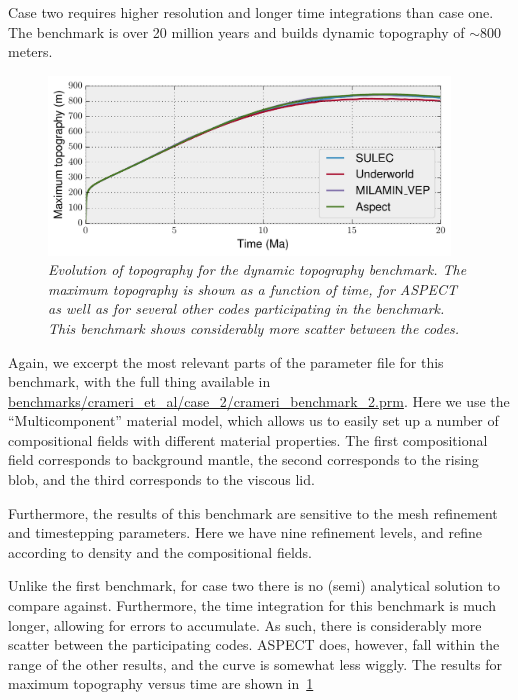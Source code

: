 \documentclass{article}
\newcommand{\aspect}{\textsc{ASPECT}}
\begin{document}
Case two requires higher resolution and longer time integrations than case one. The benchmark
is over 20 million years and builds dynamic topography of $\sim 800$ meters.  

\begin{figure}
  \begin{center}
    \includegraphics[width=0.95\textwidth]{cookbooks/benchmarks/crameri/crameri_2_comparison.pdf}
  \end{center}
  \caption{\it Evolution of topography for the dynamic topography benchmark. The maximum topography
   is shown as a function of time, for \aspect{} as well as for several other codes participating in
   the benchmark. This benchmark shows considerably more scatter between the codes.}
  \label{fig:crameri-2-comparison}
\end{figure}

Again, we excerpt the most relevant parts of the parameter file for this benchmark, with the 
full thing available in \url{benchmarks/crameri_et_al/case_2/crameri_benchmark_2.prm}.
Here we use the ``Multicomponent'' material model, which allows us to easily set up a number 
of compositional fields with different material properties. The first compositional field 
corresponds to background mantle, the second corresponds to the rising blob, and the third 
corresponds to the viscous lid.


Furthermore, the results of this benchmark are sensitive to the mesh refinement and timestepping 
parameters. Here we have nine refinement levels, and refine according to density and the 
compositional fields.



Unlike the first benchmark, for case two there is no (semi) analytical solution to compare against.
Furthermore, the time integration for this benchmark is much longer, allowing for errors to 
accumulate. As such, there is considerably more scatter between the participating codes.  \aspect{}
does, however, fall within the range of the other results, and the curve is somewhat less wiggly.
The results for maximum topography versus time are shown in~\ref{fig:crameri-2-comparison}
\end{document}
